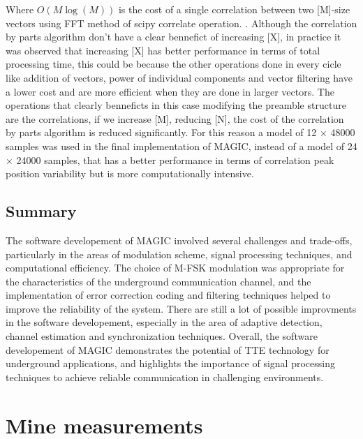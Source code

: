 Where $O(M\log(M))$ is the cost of a single correlation between two [M]-size vectors using FFT method of scipy correlate operation. \cite{scipyCorrelatex2014}. Although the correlation by parts algorithm don't have a clear bennefict of increasing [X], in practice it was observed that increasing [X] has better performance in terms of total processing time, this could be because the other operations done in every cicle like addition of vectors, power of individual components and vector filtering have a lower cost and are more efficient when they are done in larger vectors. The operations that clearly benneficts in this case modifying the preamble structure are the correlations, if we increase [M], reducing [N], the cost of the correlation by parts algorithm is reduced significantly. For this reason a model of 12 $\times$ 48000 samples was used in the final implementation of MAGIC, instead of a model of 24 $\times$ 24000 samples, that has a better performance in terms of correlation peak position variability but is more computationally intensive. 



\subsection{Summary}
The software developement of MAGIC involved several challenges and trade-offs, particularly in the areas of modulation scheme, signal processing techniques, and computational efficiency. The choice of M-FSK modulation was appropriate for the characteristics of the underground communication channel, and the implementation of error correction coding and filtering techniques helped to improve the reliability of the system. 
\newp
There are still a lot of possible improvments in the software developement, especially in the area of adaptive detection, channel estimation and synchronization techniques. Overall, the software developement of MAGIC demonstrates the potential of TTE technology for underground applications, and highlights the importance of signal processing techniques to achieve reliable communication in challenging environments. 



\section{Mine measurements}

